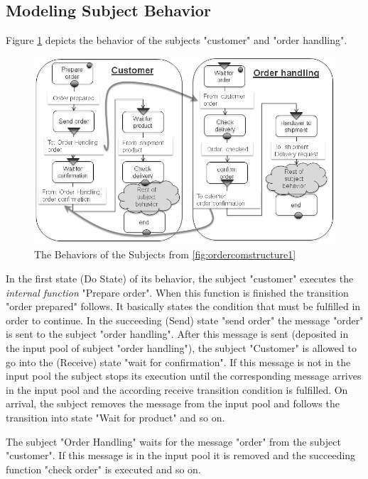 \subsection{Modeling Subject Behavior}

Figure \ref{fig:ordercustomerorderhandling} depicts the behavior of the subjects "customer" and "order handling".

\begin{figure}[htbp]
	\centering
	\includegraphics[width=0.9\linewidth]{Figures/Ontology/SubjectBehavior/OrderCustomerOrderHandling}
	\caption[The Behaviors of the Subjects from \ref{fig:ordercomstructure1} ]{The Behaviors of the Subjects from \ref{fig:ordercomstructure1}}
	\label{fig:ordercustomerorderhandling}
\end{figure}

In the first state (Do State) of its behavior, the subject "customer" executes the \textit{internal function}  "Prepare order". When this function is finished the transition "order prepared" follows. It basically states the condition that must be fulfilled in order to continue. In the succeeding (Send) state "send order" the message "order" is sent to the subject "order handling". After this message is sent (deposited in the input pool of subject "order handling"), the subject "Customer" is allowed to go into the (Receive) state "wait for confirmation". If this message is not in the input pool the subject stops its execution until the corresponding message arrives in the input pool and the according receive transition condition is fulfilled. On arrival, the subject removes the message from the input pool and follows the transition into state "Wait for product" and so on.

The subject "Order Handling" waits for the message "order" from the subject "customer". If this message is in the input pool it is removed and the succeeding function "check order" is executed and so on.


